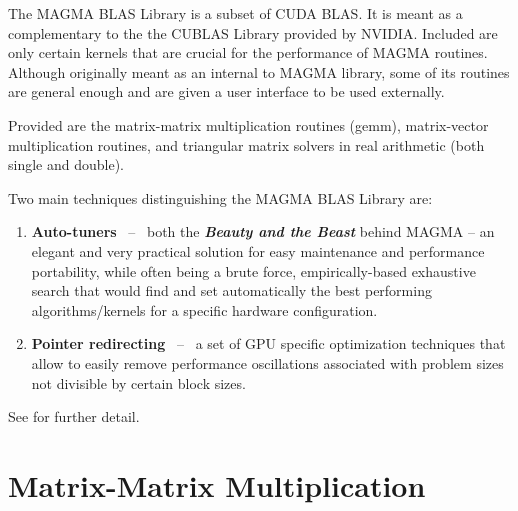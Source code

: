 \documentclass[10pt]{book}
\begin{document}
\vspace{0.1in}
The MAGMA BLAS Library is a subset of CUDA BLAS. It is meant as a 
complementary to the the CUBLAS Library provided by NVIDIA. 
Included are only certain kernels that are crucial for the performance 
of MAGMA routines. Although originally meant as an internal to MAGMA 
library, some of its routines are general enough and are given a user
interface to be used externally.

\vspace{0.1in}
Provided are the matrix-matrix multiplication routines (gemm), 
matrix-vector multiplication routines, and triangular matrix solvers
in real arithmetic (both single and double).

\vspace{0.1in}
Two main techniques distinguishing the MAGMA BLAS Library are:
\begin{enumerate}
  \item {\bf Auto-tuners} ~--~ both the {\bf {\it Beauty and the Beast}} 
  behind  MAGMA -- an elegant and very practical solution for easy maintenance 
  and performance portability, while often being a brute force, empirically-based
  exhaustive search that would find and set automatically the best performing 
  algorithms/kernels for a specific hardware configuration.
  \item {\bf Pointer redirecting} ~--~ a set of GPU specific optimization
  techniques that allow to easily remove performance oscillations associated
  with problem sizes not divisible by certain block sizes.
\end{enumerate}

\vspace{0.1in}
See \cite{lawn212,Rajib-SC09-poster} for further detail.

\newpage
\section{Matrix-Matrix Multiplication}


\vspace{0.2in}
\footnotesize
\end{document}
